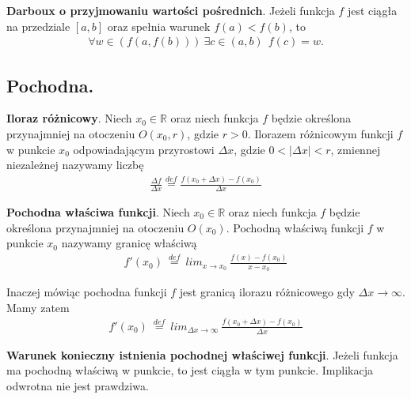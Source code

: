 \documentclass[12pt]{article}
\begin{document}
    \begin{theorem}
        \textbf{Darboux o przyjmowaniu wartości pośrednich}. Jeżeli funkcja $f$ jest ciągła na przedziale $[a,b]$ oraz
        spełnia warunek $f(a) < f(b)$, to
        \begin{align*}
            \forall w \in (f(a, f(b))) ~ \exists c \in (a,b) ~~ f(c) = w.
        \end{align*}
    \end{theorem}


    \subsection{Pochodna.}

    \begin{definition}
        \textbf{Iloraz różnicowy}. Niech  $x_0 \in \mathbb{R}$ oraz niech funkcja $f$ będzie określona przynajmniej
        na otoczeniu $O(x_0, r)$, gdzie $r > 0$. Ilorazem różnicowym funkcji $f$ w punkcie $x_0$  odpowiadającym przyrostowi
        $\Delta x$, gdzie $0 < |\Delta x| < r$, zmiennej niezależnej nazywamy liczbę
        \begin{align*}
            \frac{\Delta f}{\Delta x} \stackrel{def}{=} \frac{f(x_0 + \Delta x) - f(x_0)}{\Delta x}
        \end{align*}
    \end{definition}

    \begin{definition}
        \textbf{Pochodna właściwa funkcji}. Niech $x_0 \in \mathbb{R}$ oraz niech funkcja $f$ będzie określona przynajmniej
        na otoczeniu $O(x_0)$. Pochodną właściwą funkcji $f$ w punkcie $x_0$ nazywamy granicę właściwą
        \begin{align*}
            f'(x_0) ~ \stackrel{def}{=} ~ lim_{x \rightarrow x_0} ~ \frac{f(x) - f(x_0)}{x - x_0}
        \end{align*}

        Inaczej mówiąc pochodna funkcji $f$ jest granicą ilorazu różnicowego gdy $\Delta x \rightarrow \infty$. Mamy zatem
        \begin{align*}
            f'(x_0) ~ \stackrel{def}{=} ~ lim_{\Delta x \rightarrow \infty} ~ \frac{f(x_0 + \Delta x) - f(x_0)}{\Delta x}
        \end{align*}
    \end{definition}

    \begin{theorem}
        \textbf{Warunek konieczny istnienia pochodnej właściwej funkcji}. Jeżeli funkcja ma pochodną właściwą w punkcie,
        to jest ciągła w tym punkcie. Implikacja odwrotna nie jest prawdziwa.
    \end{theorem}
\end{document}
